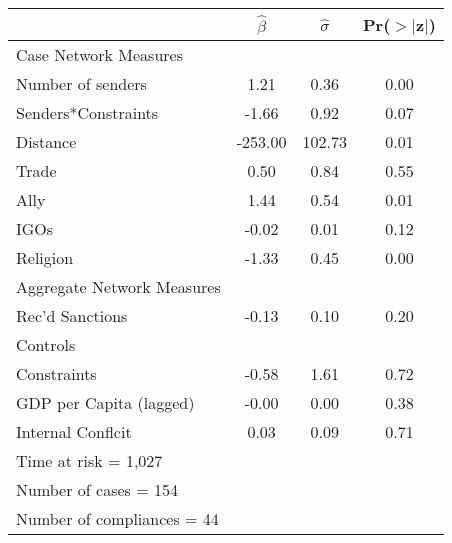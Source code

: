 \begin{table}[ht]
	\begin{center}
			\begin{tabular}{lccc}
			\hline\hline
			&$\hat{\beta}$&$\hat{\sigma}$& Pr($>$$|$z$|$) \\
			\hline
			Case Network Measures \\		
			\;\;\; Number of senders & 1.21 & 0.36 & 0.00 \\ 
			\;\;\; Senders*Constraints & -1.66 & 0.92 & 0.07 \\ 		
			\;\;\; Distance & -253.00 & 102.73 & 0.01 \\ 		
			\;\;\; Trade & 0.50 & 0.84 & 0.55 \\ 
			\;\;\; Ally & 1.44 & 0.54 & 0.01 \\ 
			\;\;\; IGOs & -0.02 & 0.01 & 0.12 \\		
			\;\;\; Religion & -1.33 & 0.45 & 0.00 \\ 
			Aggregate Network Measures \\		
			\;\;\; Rec'd Sanctions & -0.13 & 0.10 & 0.20 \\ 
			Controls \\		
			\;\;\; Constraints & -0.58 & 1.61 & 0.72 \\ 
			\;\;\; GDP per Capita (lagged) & -0.00 & 0.00 & 0.38 \\ 
			\;\;\; Internal Conflcit & 0.03 & 0.09 & 0.71 \\ 
			\hline
			Time at risk = 1,027 &&&\\
			Number of cases = 154 &&&\\
			Number of compliances = 44 &&&\\
			\hline\hline
	\end{tabular}	
	\end{center}
\end{table}